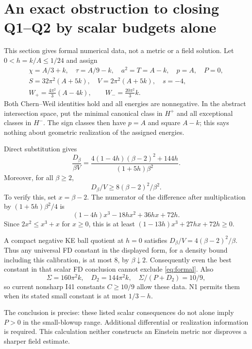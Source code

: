 \documentclass[11pt,a4paper]{article}
\theoremstyle{remark}\newtheorem{remark}[theorem]{Remark}
\begin{document}
\section{An exact obstruction to closing Q1--Q2 by scalar budgets alone}
This section gives formal numerical data, not a metric or a field solution.
Let $0<h=k/A\le1/24$ and assign
\begin{gather*}
 \chi=A/3+k,\quad\tau=A/9-k,\quad a^2=T=A-k,\quad p=A,\quad P=0,\\
 S=32\pi^2(A+5k),\quad V=2\pi^2(A+5k),\quad s=-4,\\
 W_+=\tfrac{4\pi^2}{3}(A-4k),\qquad W_-=\tfrac{20\pi^2}{3}k.
\end{gather*}
Both Chern--Weil identities hold and all energies are nonnegative. In the abstract intersection space, put the minimal canonical class in $H^+$ and all exceptional classes in $H^-$. The sign classes then have $p=A$ and square $A-k$; this says nothing about geometric realization of the assigned energies.

Direct substitution gives
\begin{equation}
 \frac{D_\beta}{\beta V}
 =\frac{4(1-4h)(\beta-2)^2+144h}{(1+5h)\beta^2}.
 \label{eq:formal}
\end{equation}
Moreover, for all $\beta\ge2$,
\begin{equation}
 D_\beta/V\ge8(\beta-2)^2/\beta^2.\label{eq:fdformal}
\end{equation}
To verify this, set $x=\beta-2$. The numerator of the difference after multiplication by $(1+5h)\beta^2/4$ is
\[
 (1-4h)x^3-18hx^2+36hx+72h.
\]
Since $2x^2\le x^3+x$ for $x\ge0$, this is at least
$(1-13h)x^3+27hx+72h\ge0$.

A compact negative KE ball quotient at $h=0$ satisfies
$D_\beta/V=4(\beta-2)^2/\beta$. Thus any universal FD constant in the displayed form, for a density bound including this calibration, is at most $8$, by $\beta\downarrow2$.
Consequently even the best constant in that scalar FD conclusion cannot exclude \eqref{eq:formal}. Also
\[
 \Sigma=160\pi^2k,\quad D_2=144\pi^2k,\quad
 \Sigma/(P+D_2)=10/9,
\]
so current nonsharp I41 constants $C\ge10/9$ allow these data. N1 permits them when its stated small constant is at most $1/3-h$.

The conclusion is precise: these listed scalar consequences do not alone imply $P>0$ in the small-blowup range. Additional differential or realization information is required. This calculation neither constructs an Einstein metric nor disproves a sharper field estimate.
\end{document}
